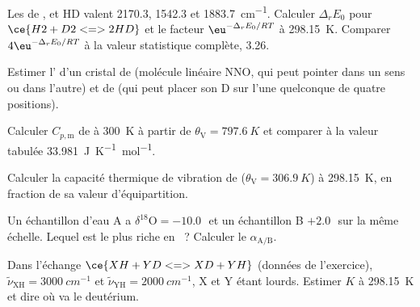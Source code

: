 \begin{exercise}[$\star\star$]\label{exo:b3:statistical-thermo-applied:5}
Les  de ,  et HD valent 2170.3,
1542.3 et
\qty{1883.7}{cm^{-1}}. Calculer $\Delta_rE_0$ pour $\ce{H2 + D2 <=> 2 HD}$ et le facteur $\eu^{-\Delta_rE_0/RT}$ à
\qty{298.15}{K}. Comparer $4\eu^{-\Delta_rE_0/RT}$ à la valeur
statistique complète, 3.26.
\end{exercise}

\begin{exercise}[$\star\star$]\label{exo:b3:statistical-thermo-applied:6}
Estimer l' d'un cristal de  (molécule
linéaire NNO, qui peut pointer dans un sens ou dans l'autre) et de
 (qui peut placer son D sur l'une quelconque de quatre
positions).
\end{exercise}

\begin{exercise}[$\star\star$]\label{exo:b3:statistical-thermo-applied:7}
Calculer $C_{p,\mathrm m}$ de  à \qty{300}{K} à partir de
$\theta_{\mathrm V} = \qty{797.6}{K}$ et comparer à la valeur tabulée
\qty{33.981}{J.K^{-1}.mol^{-1}}.
\end{exercise}

\begin{exercise}[$\star\star$]\label{exo:b3:statistical-thermo-applied:8}
Calculer la capacité thermique de vibration de 
($\theta_{\mathrm V} = \qty{306.9}{K}$) à
\qty{298.15}{K}, en fraction de sa valeur d'équipartition.
\end{exercise}

\begin{exercise}[$\star\star$]\label{exo:b3:statistical-thermo-applied:9}
Un échantillon d'eau A a $\delta^{18}\mathrm O = -10.0$\,\textperthousand\
et un échantillon B
$+2.0$\,\textperthousand\ sur la même échelle. Lequel est le plus riche
en \ce{^{18}O}~? Calculer le
 $\alpha_{\mathrm{A/B}}$.
\end{exercise}

\begin{exercise}[$\star\star\star$]\label{exo:b3:statistical-thermo-applied:10}
Dans l'échange $\ce{XH + YD <=> XD + YH}$ (données de l'exercice), $\tilde\nu_{\mathrm{XH}} =
\qty{3000}{cm^{-1}}$ et $\tilde\nu_{\mathrm{YH}} = \qty{2000}{cm^{-1}}$, X
et Y étant lourds. Estimer $K$ à
\qty{298.15}{K} et dire où va le deutérium.
\end{exercise}

